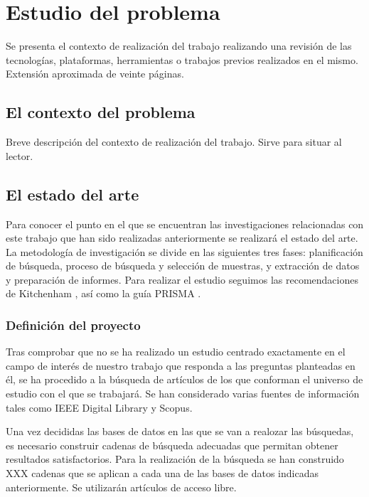\documentclass[12pt,a4paper,onecolumn,oneside]{report}
\begin{document}

\chapter{Estudio del problema}
\label{Estudio del problema}

Se presenta el contexto de realización del trabajo realizando una revisión de las tecnologías, plataformas, herramientas o trabajos previos realizados en el mismo. Extensión aproximada de veinte páginas.

\section{El contexto del problema}

Breve descripción del contexto de realización del trabajo. Sirve para situar al lector.


\section{El estado del arte}

Para conocer el punto en el que se encuentran las investigaciones relacionadas con este trabajo que han sido realizadas anteriormente se realizará el estado del arte. La metodología de investigación se divide en las siguientes tres fases: planificación de búsqueda, proceso de búsqueda y selección de muestras, y extracción de datos y preparación de informes. Para realizar el estudio seguimos las recomendaciones de Kitchenham \cite{nueve}, así como la guía PRISMA \cite{diez}. 

\subsection{Definición del proyecto}

Tras comprobar que no se ha realizado un estudio centrado exactamente en el campo de interés de nuestro trabajo que responda a las preguntas planteadas en él, se ha procedido a la búsqueda de artículos de los que conforman el universo de estudio con el que se trabajará. Se han considerado varias fuentes de información tales como IEEE Digital Library y Scopus.

Una vez decididas las bases de datos en las que se van a realozar las búsquedas, es necesario construir cadenas de búsqueda adecuadas que permitan obtener resultados satisfactorios. Para la realización de la búsqueda se han construido XXX cadenas que se aplican a cada una de las bases de datos indicadas anteriormente. Se utilizarán artículos de acceso libre.
\end{document}
